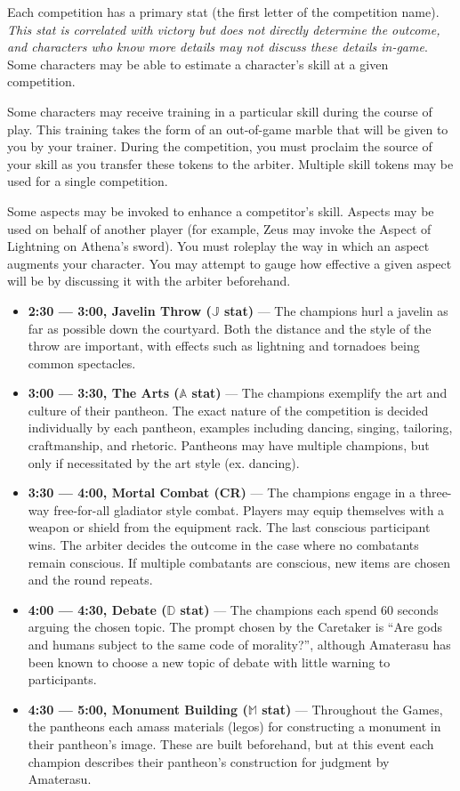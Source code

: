 \documentclass[green]{guardians}
\begin{document}
Each competition has a primary stat (the first letter of the competition name). \emph{This stat is correlated with victory but does not directly determine the outcome, and characters who know more details may not discuss these details in-game}. Some characters may be able to estimate a character's skill at a given competition.

Some characters may receive training in a particular skill during the course of play. This training takes the form of an out-of-game marble that will be given to you by your trainer. During the competition, you must proclaim the source of your skill as you transfer these tokens to the arbiter. Multiple skill tokens may be used for a single competition.

Some aspects may be invoked to enhance a competitor's skill. Aspects may be used on behalf of another player (for example, Zeus may invoke the Aspect of Lightning on Athena's sword). You must roleplay the way in which an aspect augments your character. You may attempt to gauge how effective a given aspect will be by discussing it with the arbiter beforehand.

\begin{itemize}
  \item \textbf{2:30 --- 3:00, Javelin Throw ($\mathbb{J}$ stat)} --- The champions hurl a javelin as far as possible down the courtyard. Both the distance and the style of the throw are important, with effects such as lightning and tornadoes being common spectacles.
	\item \textbf{3:00 --- 3:30, The Arts ($\mathbb{A}$ stat)} --- The champions exemplify the art and culture of their pantheon. The exact nature of the competition is decided individually by each pantheon, examples including dancing, singing, tailoring, craftmanship, and rhetoric. Pantheons may have multiple champions, but only if necessitated by the art style (ex. dancing).
	\item \textbf{3:30 --- 4:00, Mortal Combat (CR)} --- The champions engage in a three-way free-for-all gladiator style combat. Players may equip themselves with a weapon or shield from the equipment rack. The last conscious participant wins. The arbiter decides the outcome in the case where no combatants remain conscious. If multiple combatants are conscious, new items are chosen and the round repeats.
	\item \textbf{4:00 --- 4:30, Debate ($\mathbb{D}$ stat)} --- The champions each spend 60 seconds arguing the chosen topic. The prompt chosen by the Caretaker is ``Are gods and humans subject to the same code of morality?'', although Amaterasu has been known to choose a new topic of debate with little warning to participants.
	\item \textbf{4:30 --- 5:00, Monument Building ($\mathbb{M}$ stat)} --- Throughout the Games, the pantheons each amass materials (legos) for constructing a monument in their pantheon's image. These are built beforehand, but at this event each champion describes their pantheon's construction for judgment by Amaterasu.
\end{itemize}
\end{document}
